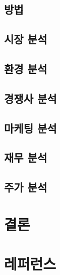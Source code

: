 \documentclass{oblivoir}
\begin{document}
		\subsection{방법}
		
		\subsection{시장 분석}
		
		\subsection{환경 분석}
		
		\subsection{경쟁사 분석}
		
		\subsection{마케팅 분석}
		
		\subsection{재무 분석}
		
		\subsection{주가 분석}
	
	\section{결론}
	
	\section{레퍼런스}
	
\end{document}
